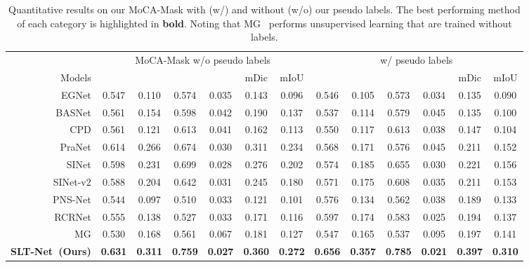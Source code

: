 \documentclass[10pt,twocolumn,letterpaper]{article}
\def\Ourmodel{SLT-Net}
\begin{document}
\begin{table*}[t!]
  \footnotesize
  \centering
  \caption{Quantitative results on our MoCA-Mask with (w/) and without (w/o) our pseudo labels. The best performing method of each category is highlighted in \textbf{bold}. 
  Noting that MG~\cite{yang2021selfsupervised} performs unsupervised learning that are trained without labels.} 
  \label{tab:Moca}
  \vspace{-5pt}
  \tabcolsep=0.3cm
  \renewcommand{\arraystretch}{0.6}
\begin{tabular}{r|cccccccccccc } 
  \toprule
  & \multicolumn{6}{c}{MoCA-Mask w/o pseudo labels} & \multicolumn{6}{c}{w/ pseudo labels} \\
  \cmidrule(lr){2-7}
  \cmidrule(lr){8-13}
  Models &  & & & & mDic & mIoU
  &  & & & & mDic & mIoU \\
  \cmidrule(lr){1-7}
  \cmidrule(lr){8-13}
  {EGNet} \cite{zhao2019EGNet} & 0.547 & 0.110 & 0.574 & 0.035 & 0.143 & 0.096 & 0.546 & 0.105 & 0.573  & 0.034 & 0.135 & 0.090 \\
  {BASNet} \cite{Qin_2019_CVPR}  & 0.561 & 0.154 & 0.598 & 0.042 & 0.190 & 0.137 & 0.537  & 0.114 & 0.579 & 0.045 & 0.135 & 0.100  \\
  {CPD} \cite{Wu_2019_CVPR} & 0.561 & 0.121 & 0.613 & 0.041 & 0.162 & 0.113 & 0.550 & 0.117 & 0.613 & 0.038 & 0.147 & 0.104 \\
  {PraNet} \cite{fan2020pra} & 0.614 & 0.266  & 0.674 & 0.030 & 0.311 & 0.234 & 0.568 & 0.171 & 0.576 & 0.045 & 0.211 & 0.152 \\
  {SINet}  \cite{fan2020Camouflage}  & 0.598 & 0.231 & 0.699 & 0.028 & 0.276 & 0.202  & 0.574 & 0.185  & 0.655 & 0.030 &  0.221 &  0.156 \\
  {SINet-v2} \cite{fan2021concealed}  & 0.588 & 0.204 & 0.642 & 0.031 & 0.245 & 0.180 & 0.571 & 0.175 & 0.608 & 0.035 & 0.211 & 0.153  \\

  \cmidrule(lr){1-7}
  \cmidrule(lr){8-13}
  {PNS-Net} \cite{ji2021progressively} & 0.544 & 0.097 &  0.510 & 0.033 & 0.121 & 0.101 & 0.576 & 0.134 & 0.562 & 0.038  & 0.189  & 0.133 \\
  {RCRNet} \cite{yan2019semi} & 0.555 &  0.138 &  0.527 &  0.033 &  0.171 & 0.116 & 0.597 & 0.174 & 0.583 & 0.025 & 0.194 & 0.137 \\
  {MG} \cite{yang2021selfsupervised}  &  0.530 & 0.168  & 0.561 &  0.067  & 0.181  & 0.127  & 0.547 & 0.165 &  0.537 &  0.095 & 0.197 & 0.141 \\

  \textbf{\Ourmodel~(Ours)} & \textbf{0.631} &  \textbf{0.311} &  \textbf{0.759} & \textbf{0.027} & \textbf{0.360} & \textbf{0.272} & \textbf{0.656} &  \textbf{0.357} & \textbf{0.785}  & \textbf{0.021}  & \textbf{0.397}  &  \textbf{0.310} \\
  \bottomrule
  \end{tabular}
\end{table*}
\end{document}

